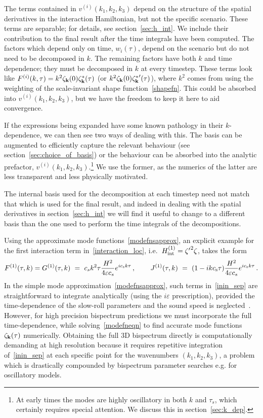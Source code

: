 \documentclass[a4paper,12pt]{extarticle}
\begin{document}
The terms contained in $v^{(i)}(k_1, k_2,k_3)$ depend on the structure of the spatial derivatives in the interaction Hamiltonian,
but not the specific scenario. These terms are separable; for details, see section~\ref{sec:h_int}.
We include their contribution to the final result after the time integrals have been computed.
The factors which depend only on time, $w_i(\tau)$, depend on the scenario
but do not need to be decomposed in $k$.
The remaining factors have both $k$ and time dependence;
they must be decomposed in $k$ at every timestep.
These terms look like $F^{(i)}(k, \tau) = k^{2} \zeta_{\bf k}(0)\zeta_{\bf k}^*(\tau)$
(or $k ^{2} \zeta_{\bf k}(0){\zeta_{\bf k}^*}'(\tau)$),
where $k^2$ comes from using the weighting of the scale-invariant shape function~\eqref{shapefn}.
This could be absorbed into $v^{(i)}(k_1, k_2,k_3)$, but we have the freedom to keep it here to aid convergence.

If the expressions being expanded have some known pathology in their $k$-dependence,
we can then see two ways of dealing with this.
The basis can be augmented to efficiently capture the relevant behaviour
(see section~\ref{sec:choice_of_basis})
or the behaviour can be absorbed into the analytic prefactor, $v^{(i)}(k_1, k_2,k_3)$.\footnote{At early times the modes are highly oscillatory in both $k$ and $\tau_s$, which certainly requires special attention.
We discuss this in section~\ref{sec:k_dep}.}
We use the former, as the numerics of the latter are less transparent
and less physically motivated.

The internal basis used for the decomposition at each timestep need not match that
which is used for the final result,
and indeed in dealing with the spatial derivatives in section~\ref{sec:h_int}
we will find it useful to change to a different basis than the one used to perform the
time integrals of the decompositions.

Using the approximate mode functions~\eqref{modefnsapprox}, an explicit example for the first interaction term in~\eqref{interaction_loc}, i.e.\ $H_{\rm int}^{(1)} = {\zeta'}^2\zeta$, takes the form
\begin{align}\label{inin_example}
    F^{(1)}(\tau,k) = G^{(1)}(\tau,k)  ~=~  c_s k^2 \tau\frac{H^2}{4\varepsilon c_s} e^{ic_{\rm s} k\tau} \, , \qquad\,
    J^{(1)}(\tau,k) ~=~ (1-ik c_{\rm s}\tau)\frac{H^2}{4\varepsilon c_s}e^{ic_{\rm s} k\tau} \,.
\end{align}
In the simple mode approximation~\eqref{modefnsapprox}, such terms in~\eqref{inin_sep} are straightforward to integrate analytically (using the $i\varepsilon$ prescription), provided the time-dependence of the slow-roll parameters and the sound speed is neglected~\cite{Maldacena}.   However, for high precision bispectrum predictions we must incorporate the full time-dependence, while solving~\eqref{modefneqn} to find accurate mode functions $\zeta_{\bf k}(\tau)$ numerically.  Obtaining the full 3D bispectrum directly is computationally demanding at high resolution because it requires repetitive integration of~\eqref{inin_sep} at each specific point for the wavenumbers $(k_1, k_2, k_3)$, a problem which is drastically compounded by bispectrum parameter searches e.g. for oscillatory models. 
\end{document}
